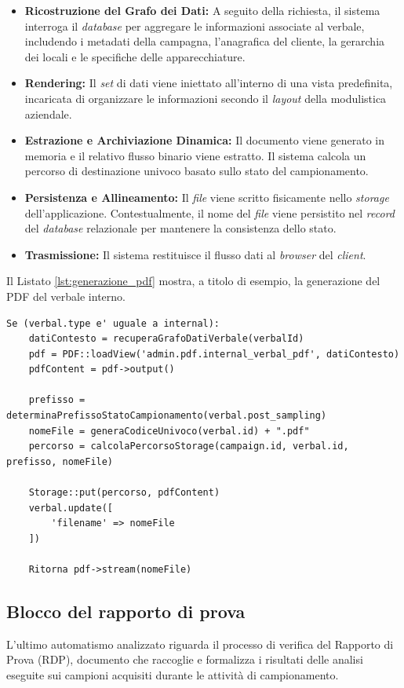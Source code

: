 \begin{itemize}
	\item \textbf{Ricostruzione del Grafo dei Dati:} A seguito della richiesta, il sistema interroga il \textit{database} per aggregare le informazioni associate al verbale, includendo i metadati della campagna, l'anagrafica del cliente, la gerarchia dei locali e le specifiche delle apparecchiature.
	\item \textbf{Rendering:} Il \textit{set} di dati viene iniettato all'interno di una vista predefinita, incaricata di organizzare le informazioni secondo il \textit{layout} della modulistica aziendale.
	\item \textbf{Estrazione e Archiviazione Dinamica:} Il documento viene generato in memoria e il relativo flusso binario viene estratto. Il sistema calcola un percorso di destinazione univoco basato sullo stato del campionamento.
	\item \textbf{Persistenza e Allineamento:} Il \textit{file} viene scritto fisicamente nello \textit{storage} dell'applicazione. Contestualmente, il nome del \textit{file} viene persistito nel \textit{record} del \textit{database} relazionale per mantenere la consistenza dello stato.
	\item \textbf{Trasmissione:} Il sistema restituisce il flusso dati al \textit{browser} del \textit{client}.
\end{itemize}

Il Listato \ref{lst:generazione_pdf} mostra, a titolo di esempio, la generazione del PDF del verbale interno.
\begin{lstlisting}[float=!t, caption={Pseudocodice del processo di rendering, archiviazione e trasmissione del verbale in formato PDF.}, captionpos=b, label={lst:generazione_pdf}, basicstyle=\ttfamily\footnotesize, breaklines=true, breakatwhitespace=true, lineskip=-1pt]
Se (verbal.type e' uguale a internal):	
	datiContesto = recuperaGrafoDatiVerbale(verbalId)
	pdf = PDF::loadView('admin.pdf.internal_verbal_pdf', datiContesto)
	pdfContent = pdf->output()
	
	prefisso = determinaPrefissoStatoCampionamento(verbal.post_sampling)
	nomeFile = generaCodiceUnivoco(verbal.id) + ".pdf"
	percorso = calcolaPercorsoStorage(campaign.id, verbal.id, prefisso, nomeFile)
	
	Storage::put(percorso, pdfContent)
	verbal.update([
		'filename' => nomeFile
	])

	Ritorna pdf->stream(nomeFile)
\end{lstlisting}
\subsection{Blocco del rapporto di prova}
L'ultimo automatismo analizzato riguarda il processo di verifica del Rapporto di Prova (RDP), documento che raccoglie e formalizza i risultati delle analisi eseguite sui campioni acquisiti durante le attività di campionamento.

